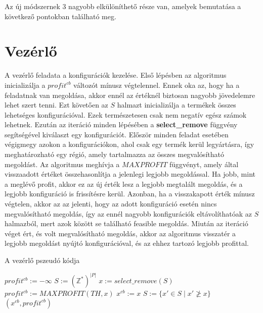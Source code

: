 Az új módszernek 3 nagyobb elkülöníthető része van, amelyek bemutatása a következő pontokban található meg.

\section{Vezérlő}
A vezérlő feladata a konfigurációk kezelése. Első lépésben az algoritmus inicializálja a $profit^{cb}$ változót mínusz végtelennel. Ennek oka az, hogy ha a feladatnak van megoldása, akkor ennél az értéknél biztosan nagyobb jövedelemre lehet szert tenni. Ezt követően az $S$ halmazt inicializálja a termékek összes lehetséges konfigurációval. Ezek természetesen csak nem negatív egész számok lehetnek. Ezután az iteráció minden lépésében a \textbf{select\_remove} függvény segítségével kiválaszt egy konfigurációt. Először minden feladat esetében végigmegy azokon a konfigurációkon, ahol csak egy termék kerül legyártásra, így meghatározható egy régió, amely tartalmazza az összes megvalósítható megoldást. Az algoritmus meghívja a $MAXPROFIT$ függvényt, amely által visszaadott értéket összehasonlítja a jelenlegi legjobb megoldással. Ha jobb, mint a meglévő profit, akkor ez az új érték lesz a legjobb megtalált megoldás, és a legjobb konfiguráció is frissítésre kerül. Azonban, ha a visszakapott érték mínusz végtelen, akkor az az jelenti, hogy az adott konfiguráció esetén nincs megvalósítható megoldás, így az ennél nagyobb konfigurációk eltávolíthatóak az $S$ halmazból, mert azok között se található feasible megoldás. Miután az iteráció véget ért, és volt megvalósítható megoldás, akkor az algoritmus visszatér a legjobb megoldást nyújtó konfigurációval, és az ehhez tartozó legjobb profittal.

\begin{algorithm}[H]
\caption{A vezérlő pszeudó kódja}
\label{vezerlo}
\begin{algorithmic}[1]
	\State $profit^{cb}:= -\infty$
	\State $S:= (\mathbb{Z}^*)^{|P|}$
    	\State $x:= select\_remove(S)$
    		\State $profit^{cb}:=MAXPROFIT(TH,x)$
    		\State $x^{cb}:=x$    		
    		\State $S:=\{x'\in{S} \mid  x' \not\ge x\}$
    	\EndIf
    \EndWhile
    	\State \Return $(x^{cb},profit^{cb})$
    \EndIf
\EndProcedure
\end{algorithmic}
\end{algorithm}

